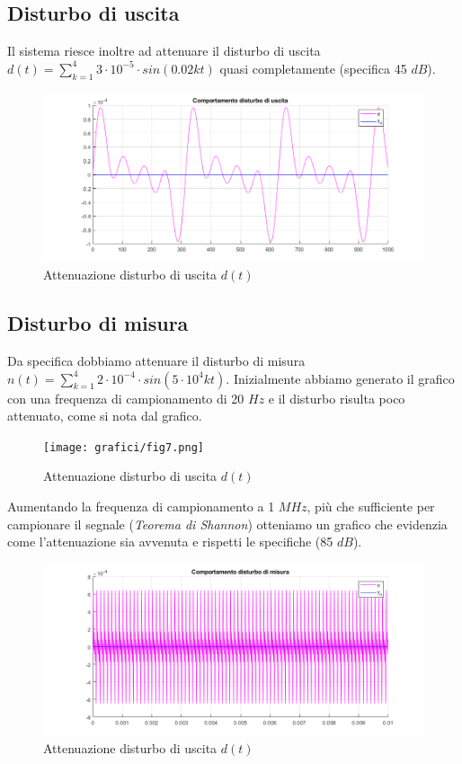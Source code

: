 \documentclass{article}
\begin{document}
\subsection{Disturbo di uscita}
Il sistema riesce inoltre ad attenuare il disturbo di uscita $d(t)=\sum_{k=1}^4 3\cdot10^{-5}\cdot sin(0.02kt)$ quasi completamente (specifica 45 $dB$).
\begin{figure}[!h]
\centering
\includegraphics[width=1\textwidth]{grafici/fig5.png}
\caption{\label{fig:orbit}Attenuazione disturbo di uscita $d(t)$}
\end{figure}

\subsection{Disturbo di misura}
Da specifica dobbiamo attenuare il disturbo di misura $n(t)=\sum_{k=1}^4 2\cdot10^{-4}\cdot sin(5\cdot 10^4kt)$. Inizialmente abbiamo generato il grafico con una frequenza di campionamento di 20 $Hz$ e il disturbo risulta poco attenuato, come si nota dal grafico.
\\
\begin{figure}[!h]
\centering
\texttt{[image: grafici/fig7.png]}
\caption{\label{fig:orbit}Attenuazione disturbo di uscita $d(t)$}
\end{figure}

\noindent
Aumentando la frequenza di campionamento a 1 $MHz$, più che sufficiente per campionare il segnale 
(\textit{Teorema di Shannon}) otteniamo un grafico che evidenzia come l'attenuazione sia avvenuta e rispetti le specifiche (85 $dB$).

\begin{figure}[!h]
\centering
\includegraphics[width=1\textwidth]{grafici/fig6.png}
\caption{\label{fig:orbit}Attenuazione disturbo di uscita $d(t)$}
\end{figure}
\end{document}
